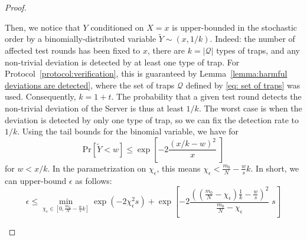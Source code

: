 \begin{proof}
\begin{enumerate}[label=\arabic*)]
    Then, we notice that $Y$ conditioned on $X=x$ is upper-bounded in the stochastic order by a binomially-distributed variable $\tilde Y \sim (x, 1/k)$.
    Indeed: the number of affected test rounds has been fixed to $x$, there are $k=|\mathcal Q|$ types of traps, and any non-trivial deviation is detected by at least one type of trap.
    For Protocol~\ref{protocol:verification}, this is guaranteed by Lemma~\ref{lemma:harmful deviations are detected}, where the set of traps $\mathcal Q$ defined by \ref{eq: set of traps} was used. Consequently, $k=1+t$.
    The probability that a given test round detects the non-trivial deviation of the Server is thus at least $1/k$.
    The worst case is when the deviation is detected by only one type of trap, so we can fix the detection rate to $1/k$.
    Using the tail bounds for the binomial variable, we have for
    \begin{equation}
        \mathrm{Pr}\left[
            \tilde Y < w
         \right]
         \leq
         \exp\left[
            -2\dfrac{(x/k-w)^2}{x} \; \right]
    \end{equation}
    for $w < x/k$.
    In the parametrization on $\chi_\epsilon$, this means $\chi_\epsilon < \frac{m_0}{N}-\frac{w}{s}k$.
    In short, we can upper-bound $\epsilon$ as follows:
    \begin{equation}
        \label{eq:epsilon}
        \epsilon \leq
        \min_{\chi_\epsilon\in[0, \frac{m_0}{N}-\frac{w}{s}k]}
        \exp(-2\chi_\epsilon^2 s) + \exp\left[
            -2\dfrac{(
                (\frac{m_0}{N}-\chi_\epsilon)
                \frac{1}{k}-\frac{w}{s}
                 )^2}{
                \frac{m_0}{N}-\chi_\epsilon
            } \; s
          \right]
    \end{equation}


\end{enumerate}
\end{proof}
